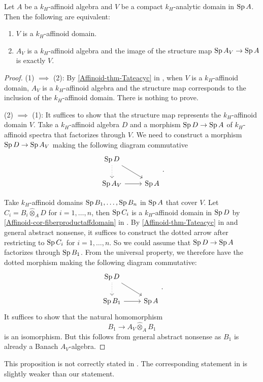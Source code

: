     \begin{proposition}\label{prop-compactanalydomainaffinoid}
        Let $A$ be a $k_H$-affinoid algebra and $V$ be a compact $k_H$-analytic domain in $\operatorname{Sp} A$. Then the following are equivalent:
        \begin{enumerate}
            \item $V$ is a $k_H$-affinoid domain.
            \item $A_V$ is a $k_H$-affinoid algebra and the image of the structure map $\operatorname{Sp} A_V\rightarrow \operatorname{Sp} A$ is exactly $V$.
        \end{enumerate}
    \end{proposition}
    \begin{proof}
        (1) $\implies$ (2): By \cref{Affinoid-thm-Tateacyc} in , when $V$ is a $k_H$-affinoid domain, $A_V$ is a $k_H$-affinoid algebra and the structure map corresponds to the inclusion of the $k_H$-affinoid domain. There is nothing to prove.
    
        (2) $\implies$ (1): It suffices to show that the structure map represents the $k_H$-affinoid domain $V$. Take a $k_H$-affinoid algebra $D$ and a morphism $\operatorname{Sp} D\rightarrow \operatorname{Sp} A$ of $k_H$-affinoid spectra that factorizes through $V$. We need to construct a morphism $\operatorname{Sp} D\rightarrow \operatorname{Sp} A_V$ making the following diagram commutative
        \[
            \begin{tikzcd}
                \Sp D \arrow[rd] \arrow[d, dotted] &       \\
                \Sp A_V \arrow[r]                  & \Sp A
            \end{tikzcd}.    
        \]
        
        Take $k_H$-affinoid domains $\operatorname{Sp} B_1,\ldots,\operatorname{Sp} B_n$ in $\operatorname{Sp} A$ that cover $V$. Let $C_i=B_i\hat{\otimes}_A D$ for $i=1,\ldots,n$, then $\operatorname{Sp} C_i$ is a $k_H$-affinoid domain in $\operatorname{Sp} D$ by \cref{Affinoid-cor-fiberproductaffdomain} in . By \cref{Affinoid-thm-Tateacyc} in  and general abstract nonsense, it suffices to construct the dotted arrow after restricting to $\operatorname{Sp} C_i$ for $i=1,\ldots,n$. So we could assume that $\operatorname{Sp} D\rightarrow \operatorname{Sp} A$ factorizes through $\operatorname{Sp} B_1$. From the universal property, we therefore have the dotted morphism making the following diagram commutative:
        \[
            \begin{tikzcd}
                \Sp D \arrow[rd] \arrow[d, dotted] &       \\
                \Sp B_1 \arrow[r]                  & \Sp A
            \end{tikzcd}.    
        \]
        It suffices to show that the natural homomorphism
        \[
            B_1\rightarrow A_V\hat{\otimes}_A B_1  
        \]
        is an isomorphism. But this follows from general abstract nonsense as $B_1$ is already a Banach $A_V$-algebra.
    \end{proof}
    \begin{remark}
        This proposition is not correctly stated in \cite[Corollary~2.2.6]{Berk12}. The corresponding statement in \cite[Remark~1.2.1]{Berk93} is slightly weaker than our statement.
    \end{remark}


